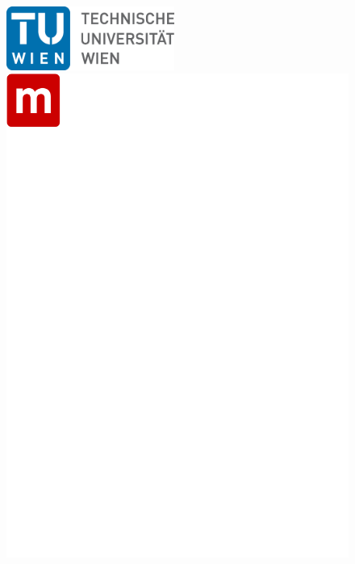 \thispagestyle{empty}	

						
\begin{figure}[htbp]
	\begin{minipage}[b]{.5\linewidth}
		\begin{flushleft}
			\includegraphics[width=5.5cm]{fig/TU_Logo}		
		\end{flushleft}

	\end{minipage}
	\begin{minipage}[b]{.5\linewidth} 
		\begin{flushright}
			\includegraphics[scale=0.65]{fig/Logo-E325}
		\end{flushright}
	\end{minipage}
\end{figure}
